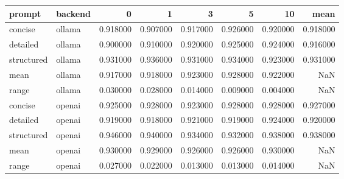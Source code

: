 \begin{tabular}{llrrrrrr}
\toprule
prompt & backend & 0 & 1 & 3 & 5 & 10 & mean \\
\midrule
concise & ollama & 0.918000 & 0.907000 & 0.917000 & 0.926000 & 0.920000 & 0.918000 \\
detailed & ollama & 0.900000 & 0.910000 & 0.920000 & 0.925000 & 0.924000 & 0.916000 \\
structured & ollama & 0.931000 & 0.936000 & 0.931000 & 0.934000 & 0.923000 & 0.931000 \\
mean & ollama & 0.917000 & 0.918000 & 0.923000 & 0.928000 & 0.922000 & NaN \\
range & ollama & 0.030000 & 0.028000 & 0.014000 & 0.009000 & 0.004000 & NaN \\
concise & openai & 0.925000 & 0.928000 & 0.923000 & 0.928000 & 0.928000 & 0.927000 \\
detailed & openai & 0.919000 & 0.918000 & 0.921000 & 0.919000 & 0.924000 & 0.920000 \\
structured & openai & 0.946000 & 0.940000 & 0.934000 & 0.932000 & 0.938000 & 0.938000 \\
mean & openai & 0.930000 & 0.929000 & 0.926000 & 0.926000 & 0.930000 & NaN \\
range & openai & 0.027000 & 0.022000 & 0.013000 & 0.013000 & 0.014000 & NaN \\
\bottomrule
\end{tabular}
